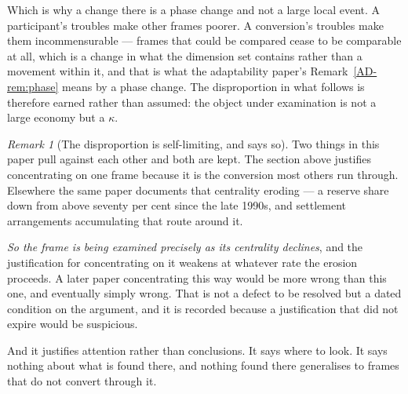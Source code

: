 \documentclass[11pt,a4paper]{article}
\theoremstyle{remark}
\newtheorem{remark}[definition]{Remark}
\begin{document}
Which is why a change there is a phase change and not a large local event. A participant's
troubles make other frames poorer. A conversion's troubles make them incommensurable --- frames
that could be compared cease to be comparable at all, which is a change in what the dimension set
contains rather than a movement within it, and that is what the adaptability paper's Remark~\ref{AD-rem:phase} means by a phase change.
The disproportion in what follows is therefore earned rather than assumed: the object under
examination is not a large economy but a $\kappa$.

\begin{remark}[The disproportion is self-limiting, and says so]\label{rem:cog}
Two things in this paper pull against each other and both are kept. The section above justifies
concentrating on one frame because it is the conversion most others run through. Elsewhere the
same paper documents that centrality eroding --- a reserve share down from above seventy per cent since
the late 1990s, and settlement arrangements accumulating that route around it.

\emph{So the frame is being examined precisely as its centrality declines}, and the justification for
concentrating on it weakens at whatever rate the erosion proceeds. A later paper concentrating
this way would be more wrong than this one, and eventually simply wrong. That is not a defect to be
resolved but a dated condition on the argument, and it is recorded because a justification that did not
expire would be suspicious.

And it justifies attention rather than conclusions. It says where to look. It says nothing
about what is found there, and nothing found there generalises to frames that do not convert through
it.
\end{remark}
\end{document}
